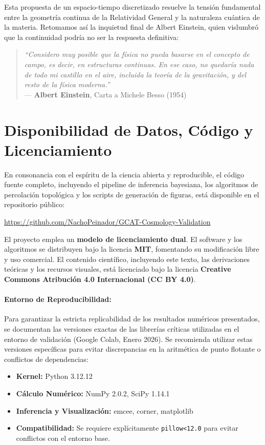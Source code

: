\documentclass[12pt, a4paper]{article}
\theoremstyle{plain}
\theoremstyle{definition}
\begin{document}
Esta propuesta de un espacio-tiempo discretizado resuelve la tensión fundamental entre la geometría continua de la Relatividad General y la naturaleza cuántica de la materia. Retomamos así la inquietud final de Albert Einstein, quien vislumbró que la continuidad podría no ser la respuesta definitiva:

\begin{quote}
\textit{``Considero muy posible que la física no pueda basarse en el concepto de campo, es decir, en estructuras continuas. En ese caso, no quedaría nada de todo mi castillo en el aire, incluida la teoría de la gravitación, y del resto de la física moderna.''} \\
--- \textbf{Albert Einstein}, Carta a Michele Besso (1954)
\end{quote}

\section*{Disponibilidad de Datos, Código y Licenciamiento}

En consonancia con el espíritu de la ciencia abierta y reproducible, el código fuente completo, incluyendo el pipeline de inferencia bayesiana, los algoritmos de percolación topológica y los scripts de generación de figuras, está disponible en el repositorio público:

\begin{center}
\url{https://github.com/NachoPeinador/GCAT-Cosmology-Validation}
\end{center}

El proyecto emplea un \textbf{modelo de licenciamiento dual}. El software y los algoritmos se distribuyen bajo la licencia \textbf{MIT}, fomentando su modificación libre y uso comercial. El contenido científico, incluyendo este texto, las derivaciones teóricas y los recursos visuales, está licenciado bajo la licencia \textbf{Creative Commons Atribución 4.0 Internacional (CC BY 4.0)}.

\paragraph{Entorno de Reproducibilidad:}
Para garantizar la estricta replicabilidad de los resultados numéricos presentados, se documentan las versiones exactas de las librerías críticas utilizadas en el entorno de validación (Google Colab, Enero 2026). Se recomienda utilizar estas versiones específicas para evitar discrepancias en la aritmética de punto flotante o conflictos de dependencias:
\begin{itemize}
    \item \textbf{Kernel:} Python 3.12.12
    \item \textbf{Cálculo Numérico:} NumPy 2.0.2, SciPy 1.14.1
    \item \textbf{Inferencia y Visualización:} emcee, corner, matplotlib
    \item \textbf{Compatibilidad:} Se requiere explícitamente \texttt{pillow<12.0} para evitar conflictos con el entorno base.
\end{itemize}
\end{document}
